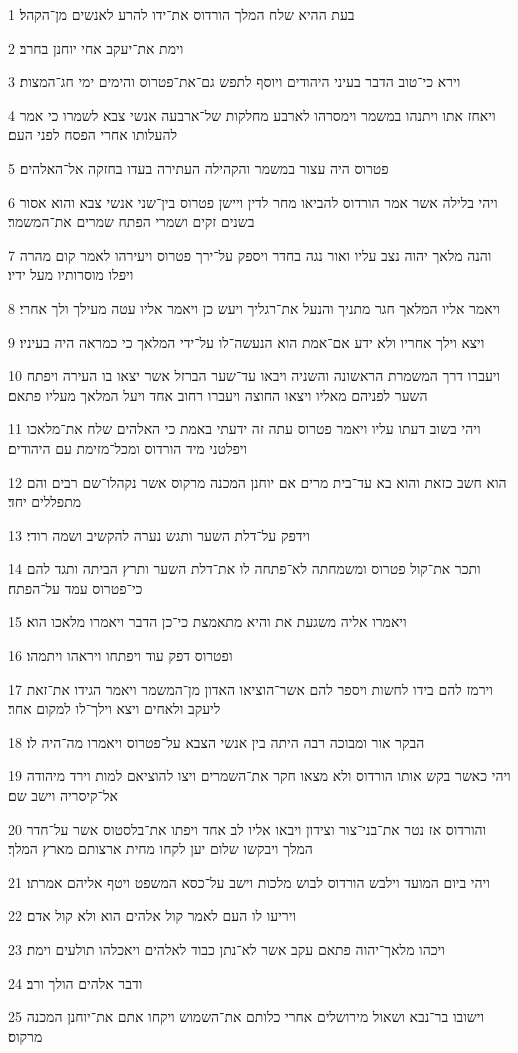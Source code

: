 \par 1 בעת ההיא שלח המלך הורדוס את־ידו להרע לאנשים מן־הקהל׃
\par 2 וימת את־יעקב אחי יוחנן בחרב׃
\par 3 וירא כי־טוב הדבר בעיני היהודים ויוסף לתפש גם־את־פטרוס והימים ימי חג־המצות׃
\par 4 ויאחז אתו ויתנהו במשמר וימסרהו לארבע מחלקות של־ארבעה אנשי צבא לשמרו כי אמר להעלותו אחרי הפסח לפני העם׃
\par 5 פטרוס היה עצור במשמר והקהילה העתירה בעדו בחזקה אל־האלהים׃
\par 6 ויהי בלילה אשר אמר הורדוס להביאו מחר לדין ויישן פטרוס בין־שני אנשי צבא והוא אסור בשנים זקים ושמרי הפתח שמרים את־המשמר׃
\par 7 והנה מלאך יהוה נצב עליו ואור נגה בחדר ויספק על־ירך פטרוס ויעירהו לאמר קום מהרה ויפלו מוסרותיו מעל ידיו׃
\par 8 ויאמר אליו המלאך חגר מתניך והנעל את־רגליך ויעש כן ויאמר אליו עטה מעילך ולך אחרי׃
\par 9 ויצא וילך אחריו ולא ידע אם־אמת הוא הנעשה־לו על־ידי המלאך כי כמראה היה בעיניו׃
\par 10 ויעברו דרך המשמרת הראשונה והשניה ויבאו עד־שער הברזל אשר יצאו בו העירה ויפתח השער לפניהם מאליו ויצאו החוצה ויעברו רחוב אחד ויעל המלאך מעליו פתאם׃
\par 11 ויהי בשוב דעתו עליו ויאמר פטרוס עתה זה ידעתי באמת כי האלהים שלח את־מלאכו ויפלטני מיד הורדוס ומכל־מזימת עם היהודים׃
\par 12 הוא חשב כזאת והוא בא עד־בית מרים אם יוחנן המכנה מרקוס אשר נקהלו־שם רבים והם מתפללים יחד׃
\par 13 וידפק על־דלת השער ותגש נערה להקשיב ושמה רודי׃
\par 14 ותכר את־קול פטרוס ומשמחתה לא־פתחה לו את־דלת השער ותרץ הביתה ותגד להם כי־פטרוס עמד על־הפתח׃
\par 15 ויאמרו אליה משגעת את והיא מתאמצת כי־כן הדבר ויאמרו מלאכו הוא׃
\par 16 ופטרוס דפק עוד ויפתחו ויראהו ויתמהו׃
\par 17 וירמז להם בידו לחשות ויספר להם אשר־הוציאו האדון מן־המשמר ויאמר הגידו את־זאת ליעקב ולאחים ויצא וילך־לו למקום אחר׃
\par 18 הבקר אור ומבוכה רבה היתה בין אנשי הצבא על־פטרוס ויאמרו מה־היה לו׃
\par 19 ויהי כאשר בקש אותו הורדוס ולא מצאו חקר את־השמרים ויצו להוציאם למות וירד מיהודה אל־קיסריה וישב שם׃
\par 20 והורדוס אז נטר את־בני־צור וצידון ויבאו אליו לב אחד ויפתו את־בלסטוס אשר על־חדר המלך ויבקשו שלום יען לקחו מחית ארצותם מארץ המלך׃
\par 21 ויהי ביום המועד וילבש הורדוס לבוש מלכות וישב על־כסא המשפט ויטף אליהם אמרתו׃
\par 22 ויריעו לו העם לאמר קול אלהים הוא ולא קול אדם׃
\par 23 ויכהו מלאך־יהוה פתאם עקב אשר לא־נתן כבוד לאלהים ויאכלהו תולעים וימת׃
\par 24 ודבר אלהים הולך ורב׃
\par 25 וישובו בר־נבא ושאול מירושלים אחרי כלותם את־השמוש ויקחו אתם את־יוחנן המכנה מרקוס׃


